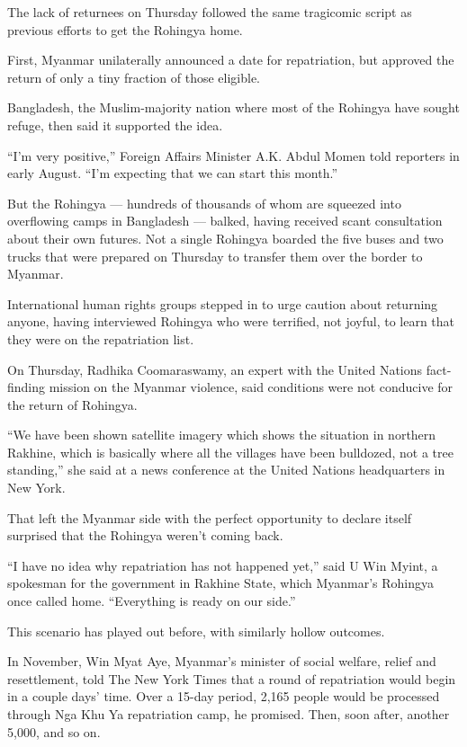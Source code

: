 The lack of returnees on Thursday followed the same tragicomic script as
previous efforts to get the Rohingya home.

First, Myanmar unilaterally announced a date for repatriation, but
approved the return of only a tiny fraction of those eligible.

Bangladesh, the Muslim-majority nation where most of the Rohingya have
sought refuge, then said it supported the idea.

``I'm very positive,'' Foreign Affairs Minister A.K. Abdul Momen told
reporters in early August. ``I'm expecting that we can start this
month.''

But the Rohingya --- hundreds of thousands of whom are squeezed into
overflowing camps in Bangladesh --- balked, having received scant
consultation about their own futures. Not a single Rohingya boarded the
five buses and two trucks that were prepared on Thursday to transfer
them over the border to Myanmar.

International human rights groups stepped in to urge caution about
returning anyone, having interviewed Rohingya who were terrified, not
joyful, to learn that they were on the repatriation list.

On Thursday, Radhika Coomaraswamy, an expert with the United Nations
fact-finding mission on the Myanmar violence, said conditions were not
conducive for the return of Rohingya.

``We have been shown satellite imagery which shows the situation in
northern Rakhine, which is basically where all the villages have been
bulldozed, not a tree standing,'' she said at a news conference at the
United Nations headquarters in New York.

That left the Myanmar side with the perfect opportunity to declare
itself surprised that the Rohingya weren't coming back.

``I have no idea why repatriation has not happened yet,'' said U Win
Myint, a spokesman for the government in Rakhine State, which Myanmar's
Rohingya once called home. ``Everything is ready on our side.''

This scenario has played out before, with similarly hollow outcomes.

In November, Win Myat Aye, Myanmar's minister of social welfare, relief
and resettlement, told The New York Times that a round of repatriation
would begin in a couple days' time. Over a 15-day period, 2,165 people
would be processed through Nga Khu Ya repatriation camp, he promised.
Then, soon after, another 5,000, and so on.


